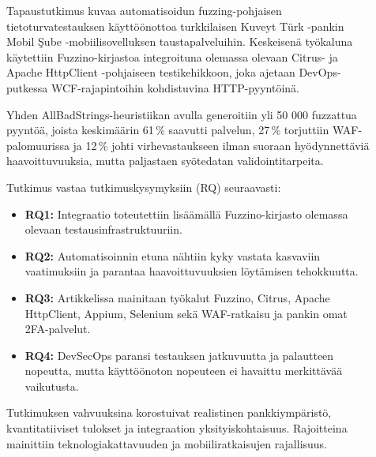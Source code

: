 \documentclass[bscthesis,finnish,oneside,biblatex]{uefcsthesis}
\begin{document}
\begin{description}
    \item[\cite{schneider_2020_fuzzing}]
    Tapaustutkimus kuvaa automatisoidun fuzzing-pohjaisen tietoturvatestauksen käyttöönottoa turkkilaisen Kuveyt Türk -pankin Mobil Şube -mobiilisovelluksen taustapalveluihin. Keskeisenä työkaluna käytettiin Fuzzino-kirjastoa integroituna olemassa olevaan Citrus- ja Apache HttpClient -pohjaiseen testikehikkoon, joka ajetaan DevOps-putkessa WCF-rajapintoihin kohdistuvina HTTP-pyyntöinä.

    Yhden AllBadStrings-heuristiikan avulla generoitiin yli 50 000 fuzzattua pyyntöä, joista keskimäärin 61\,\% saavutti palvelun, 27\,\% torjuttiin WAF-palomuurissa ja 12\,\% johti virhevastaukseen ilman suoraan hyödynnettäviä haavoittuvuuksia, mutta paljastaen syötedatan validointitarpeita.

    Tutkimus vastaa tutkimuskysymyksiin (RQ) seuraavasti:
    \begin{itemize}
        \item \textbf{RQ1:} Integraatio toteutettiin lisäämällä Fuzzino-kirjasto olemassa olevaan testausinfrastruktuuriin.
        \item \textbf{RQ2:} Automatisoinnin etuna nähtiin kyky vastata kasvaviin vaatimuksiin ja parantaa haavoittuvuuksien löytämisen tehokkuutta.
        \item \textbf{RQ3:} Artikkelissa mainitaan työkalut Fuzzino, Citrus, Apache HttpClient, Appium, Selenium sekä WAF-ratkaisu ja pankin omat 2FA-palvelut.
        \item \textbf{RQ4:} DevSecOps paransi testauksen jatkuvuutta ja palautteen nopeutta, mutta käyttöönoton nopeuteen ei havaittu merkittävää vaikutusta.
    \end{itemize}

    Tutkimuksen vahvuuksina korostuivat realistinen pankkiympäristö, kvantitatiiviset tulokset ja integraation yksityiskohtaisuus. Rajoitteina mainittiin teknologiakattavuuden ja mobiiliratkaisujen rajallisuus.
\end{description}
\end{document}
